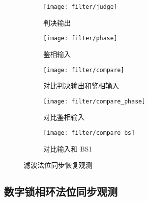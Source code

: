 \documentclass[../main]{subfiles}
\begin{document}
\begin{figure}[htbp]
  \centering
  \begin{subfigure}[htbp]{0.45\linewidth}
    \centering
    \texttt{[image: filter/judge]}
    \caption{判决输出}%
    \label{fig:filter/judge}
  \end{subfigure}
  \quad
  \begin{subfigure}[htbp]{0.45\linewidth}
    \centering
    \texttt{[image: filter/phase]}
    \caption{鉴相输入}%
    \label{fig:filter/phase}
  \end{subfigure}

  \begin{subfigure}[htbp]{0.45\linewidth}
    \centering
    \texttt{[image: filter/compare]}
    \caption{对比判决输出和鉴相输入}%
    \label{fig:filter/compare}
  \end{subfigure}
  \quad
  \begin{subfigure}[htbp]{0.45\linewidth}
    \centering
    \texttt{[image: filter/compare\_phase]}
    \caption{对比鉴相输入}%
    \label{fig:filter/compare_phase}
  \end{subfigure}

  \begin{subfigure}[htbp]{0.45\linewidth}
    \centering
    \texttt{[image: filter/compare\_bs]}
    \caption{对比输入和 BS1}%
    \label{fig:filter/compare_bs}
  \end{subfigure}
  \caption{滤波法位同步恢复观测}%
  \label{fig:filter}
\end{figure}

\subsection{数字锁相环法位同步观测}%
\label{sub:dpll}


\end{document}
